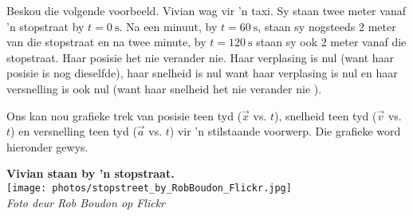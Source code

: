 \begin{minipage}{.5\textwidth}
Beskou die volgende voorbeeld. Vivian wag vir 'n taxi. Sy staan twee meter vanaf 'n stopstraat by $t=0~\text{s}$. Na een minuut, by $t=60~\text{s}$, staan sy nogsteeds 2 meter van die stopstraat en na twee minute, by $t=120~\text{s}$ staan sy ook  2 meter vanaf die stopstraat. Haar posisie het nie verander nie. Haar verplasing is nul (want haar posisie is nog dieselfde), haar snelheid is nul want haar verplasing is nul en haar versnelling is ook nul (want haar snelheid het nie verander nie ).

Ons kan nou grafieke trek van posisie teen tyd ($\vec{x}$ vs. $t$), snelheid teen tyd ($\vec{v}$ vs. $t$) en versnelling teen tyd ($\vec{a}$ vs. $t$) vir 'n stilstaande voorwerp. Die grafieke word hieronder gewys.
\end{minipage}
\begin{minipage}{.5\textwidth}
\begin{center}
 \textbf{Vivian staan by 'n stopstraat.}\\
\texttt{[image: photos/stopstreet\_by\_RobBoudon\_Flickr.jpg]}\\
\textit{Foto deur Rob Boudon op Flickr}
\end{center}
\end{minipage}



